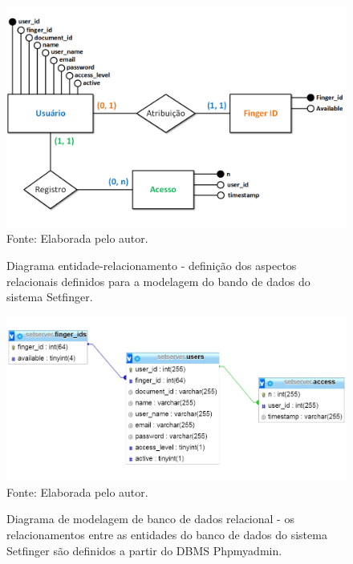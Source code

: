 \begin{figure}[!ht]
  \begin{center}
  \caption{Diagrama entidade-relacionamento - definição dos aspectos relacionais definidos para a modelagem do bando de dados do sistema Setfinger.}
  \includegraphics[scale=0.5]{figuras/cap4/diagrama_DER.png}\\
  Fonte: Elaborada pelo autor.
  \label{diagrama_DER}
  \end{center}
  \end{figure}
  
  
  
\begin{figure}[!ht]
  \begin{center}
  \caption{Diagrama de modelagem de banco de dados relacional - os relacionamentos entre as entidades do banco de dados do sistema Setfinger são definidos a partir do DBMS Phpmyadmin.}  
  \includegraphics[scale=0.55]{figuras/cap4/diagrama_ER.jpg}\\
  Fonte: Elaborada pelo autor.
  \label{diagrama_ER}
  \end{center}
  \end{figure}
  

